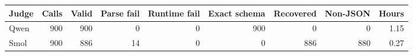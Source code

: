 

\footnotesize
\begin{tabular*}{\textwidth}{@{\extracolsep{\fill}}lrrrrrrrr}
\toprule
Judge & Calls & Valid & Parse fail & Runtime fail & Exact schema & Recovered & Non-JSON & Hours\\
\midrule
Qwen & 900 & 900 & 0 & 0 & 900 & 0 & 0 & 1.15\\
Smol & 900 & 886 & 14 & 0 & 0 & 886 & 880 & 0.27\\
\bottomrule
\end{tabular*}
